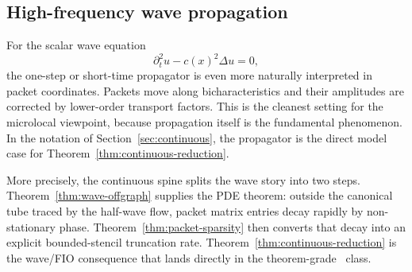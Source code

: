 \subsection{High-frequency wave propagation}

For the scalar wave equation
\[
\partial_t^2 u - c(x)^2\Delta u = 0,
\]
the one-step or short-time propagator is even more naturally interpreted in packet coordinates. Packets move along bicharacteristics and their amplitudes are corrected by lower-order transport factors. This is the cleanest setting for the microlocal viewpoint, because propagation itself is the fundamental phenomenon. In the notation of Section~\ref{sec:continuous}, the propagator is the direct model case for Theorem~\ref{thm:continuous-reduction}.

More precisely, the continuous spine splits the wave story into two steps. Theorem~\ref{thm:wave-offgraph} supplies the PDE theorem: outside the canonical tube traced by the half-wave flow, packet matrix entries decay rapidly by non-stationary phase. Theorem~\ref{thm:packet-sparsity} then converts that decay into an explicit bounded-stencil truncation rate. Theorem~\ref{thm:continuous-reduction} is the wave/FIO consequence that lands directly in the theorem-grade \MiNO\ class.

